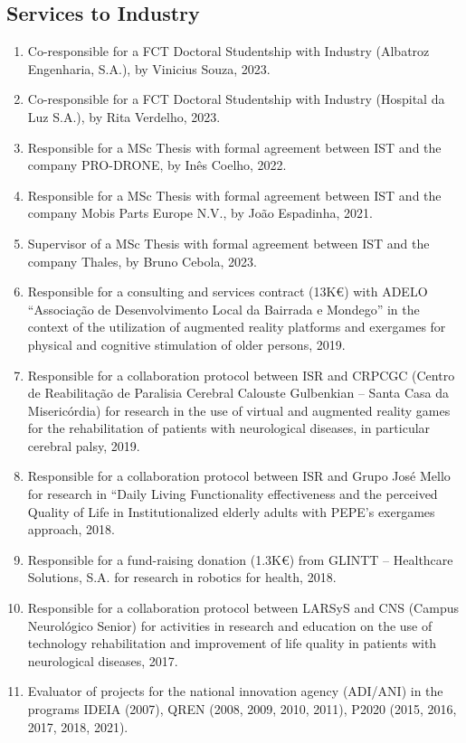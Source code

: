 \subsection{Services to Industry}\label{services-to-industry}

\begin{enumerate}
\def\labelenumi{\arabic{enumi}.}
\item
  Co-responsible for a FCT Doctoral Studentship with Industry (Albatroz
  Engenharia, S.A.), by Vinicius Souza, 2023.
\item
  Co-responsible for a FCT Doctoral Studentship with Industry (Hospital
  da Luz S.A.), by Rita Verdelho, 2023.
\item
  Responsible for a MSc Thesis with formal agreement between IST and the
  company PRO-DRONE, by Inês Coelho, 2022.
\item
  Responsible for a MSc Thesis with formal agreement between IST and the
  company Mobis Parts Europe N.V., by João Espadinha, 2021.
\item
  Supervisor of a MSc Thesis with formal agreement between IST and the
  company Thales, by Bruno Cebola, 2023.
\item
  Responsible for a consulting and services contract (13K€) with ADELO
  ``Associação de Desenvolvimento Local da Bairrada e Mondego'' in the
  context of the utilization of augmented reality platforms and
  exergames for physical and cognitive stimulation of older persons,
  2019.
\item
  Responsible for a collaboration protocol between ISR and CRPCGC
  (Centro de Reabilitação de Paralisia Cerebral Calouste Gulbenkian --
  Santa Casa da Misericórdia) for research in the use of virtual and
  augmented reality games for the rehabilitation of patients with
  neurological diseases, in particular cerebral palsy, 2019.
\item
  Responsible for a collaboration protocol between ISR and Grupo José
  Mello for research in ``Daily Living Functionality effectiveness and
  the perceived Quality of Life in Institutionalized elderly adults with
  PEPE's exergames approach, 2018.
\item
  Responsible for a fund-raising donation (1.3K€) from GLINTT --
  Healthcare Solutions, S.A. for research in robotics for health, 2018.
\item
  Responsible for a collaboration protocol between LARSyS and CNS
  (Campus Neurológico Senior) for activities in research and education
  on the use of technology rehabilitation and improvement of life
  quality in patients with neurological diseases, 2017.
\item
  Evaluator of projects for the national innovation agency (ADI/ANI) in
  the programs IDEIA (2007), QREN (2008, 2009, 2010, 2011), P2020 (2015,
  2016, 2017, 2018, 2021).
\end{enumerate}

